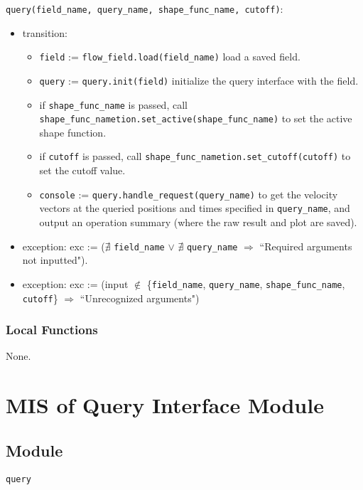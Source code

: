 \documentclass[12pt, titlepage]{article}
\begin{document}
\noindent \texttt{query(field\_name, query\_name, shape\_func\_name, cutoff)}:
\begin{itemize}
  \item transition:
  \begin{itemize}
    \item \texttt{field} := \texttt{flow\_field.load(field\_name)} load a saved field.
    \item \texttt{query} := \texttt{query.init(field)} initialize the query interface with the field.
    \item if \texttt{shape\_func\_name} is passed, call \texttt{shape\_func\_nametion.set\_active(shape\_func\_name)} to set the active shape function.
    \item if \texttt{cutoff} is passed, call \texttt{shape\_func\_nametion.set\_cutoff(cutoff)} to set the cutoff value.
    \item \texttt{console} := \texttt{query.handle\_request(query\_name)} to get the velocity vectors at the queried positions and times specified in \texttt{query\_name}, and output an operation summary (where the raw result and plot are saved).
  \end{itemize}
  \item exception: exc := ($\nexists$ \texttt{field\_name} $\vee$ $\nexists$ \texttt{query\_name} $\Rightarrow$ ``Required arguments not inputted"). 
  \item exception: exc := (input $\notin$ \{\texttt{field\_name}, \texttt{query\_name}, \texttt{shape\_func\_name}, \texttt{cutoff}\} $\Rightarrow$ ``Unrecognized arguments")
\end{itemize}

\subsubsection{Local Functions}

None.


\newpage
\section{MIS of Query Interface Module} \label{mQuery} 



\subsection{Module}
\texttt{query}
\end{document}
